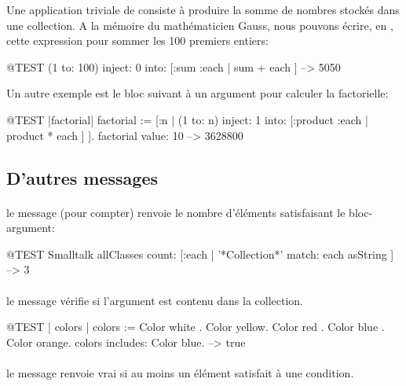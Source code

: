 \documentclass[a4paper,10pt,twoside]{book}
\begin{document}
Une application triviale de   consiste à produire 
la somme de nombres stockés dans une collection.
A la mémoire du mathématicien Gauss, nous pouvons écrire, en \pharo, cette expression pour sommer les 100 premiers entiers:
\begin{code}{@TEST}
(1 to: 100) inject: 0 into: [:sum :each | sum + each ] --> 5050
\end{code}


Un autre exemple est le bloc suivant à un argument pour calculer la factorielle:

\begin{code}{@TEST |factorial|}
factorial := [:n | (1 to: n) inject: 1 into: [:product :each | product * each ] ].
factorial value: 10 --> 3628800
\end{code}

\subsection{D'autres messages}

\paragraph{} le message  (pour compter) renvoie le nombre d'éléments satisfaisant le bloc-argument: %

\begin{code}{@TEST}
Smalltalk allClasses count: [:each | '*Collection*' match: each asString ] --> 3
\end{code} %

\paragraph{} le message  vérifie si l'argument est contenu dans la collection.

\begin{code}{@TEST | colors |}
colors := {Color white . Color yellow. Color red . Color blue . Color orange}.
colors includes: Color blue. --> true
\end{code}

\paragraph{} le message  renvoie vrai si au moins un élément satisfait à une condition. 
\end{document}
